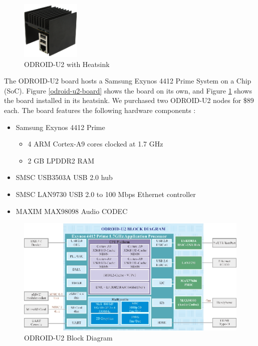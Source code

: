 \documentclass[11pt]{book}
\begin{document}
\begin{figure}
\centering
\includegraphics[width=0.25\textwidth]{odroid_u2}
\caption{ODROID-U2 with Heatsink \cite{odroid-u2-board-detail}}\label{odroid-u2}
\end{figure}

The ODROID-U2 board hosts a Samsung Exynos 4412 Prime System on a Chip (SoC).  Figure
\ref{odroid-u2-board} shows the board on its own, and Figure \ref{odroid-u2} shows the
board installed in its heatsink.  We purchased two ODROID-U2 nodes for \$89 each.  The
board features the following hardware components \cite{odroid-u2-board-detail}:

\begin{itemize}
\item Samsung Exynos 4412 Prime
  \begin{itemize}
  \item 4 ARM Cortex-A9 cores clocked at 1.7 GHz
  \item 2 GB LPDDR2 RAM
  \end{itemize}
\item SMSC USB3503A USB 2.0 hub
\item SMSC LAN9730 USB 2.0 to 100 Mbps Ethernet controller
\item MAXIM MAX98098 Audio CODEC
\end{itemize}

\begin{figure}
\centering
\includegraphics[width=\textwidth]{odroid_u2_block_diagram}
\caption{ODROID-U2 Block Diagram \cite{odroid-u2-board-detail}}
\label{odroid-u2-block-diagram}
\end{figure}
\end{document}
